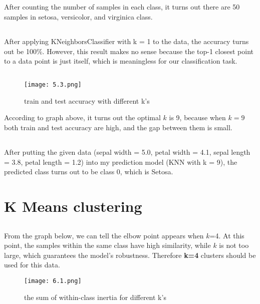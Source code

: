 \documentclass{article}
\begin{document}
    \subsection{}\label{5.1}
        
        After counting the number of samples in each class, 
        it turns out there are 50 samples in setosa, versicolor, and virginica class.

    \subsection{}\label{5.2}

        After applying KNeighborsClassifier with k = 1 to the data, the accuracy turns out be 100\%.
        However, this result makes no sense because the top-1 closest point to a data point is just itself,
        which is meaningless for our classification task.

    \subsection{}\label{5.3}

        \begin{figure}[hbt!]
            \centering
            \caption{train and test accuracy with different k's}
            \texttt{[image: 5.3.png]}
        \end{figure}

        According to graph above, it turns out the optimal $k$ is 9, 
        because when $k=9$ both train and test accuracy are high, and the gap between them is small.

    \subsection{}\label{5.4}

        After putting the given data (sepal width = 5.0, petal width = 4.1, sepal length = 3.8, petal length = 1.2)
        into my prediction model (KNN with k = 9), the predicted class turns out to be class 0, which is Setosa.

    \section{K Means clustering}

    \subsection{}\label{6.1}
        From the graph below, we can tell the elbow point appears when $k$=4.
        At this point, the samples within the same class have high similarity,
        while $k$ is not too large, which guarantees the model's robustness.
        Therefore \textbf{k=4} clusters should be used for this data.
        \begin{figure}[hbt!]
            \centering
            \caption{the sum of within-class inertia for different k's}
            \texttt{[image: 6.1.png]}
        \end{figure}
        
\end{document}
